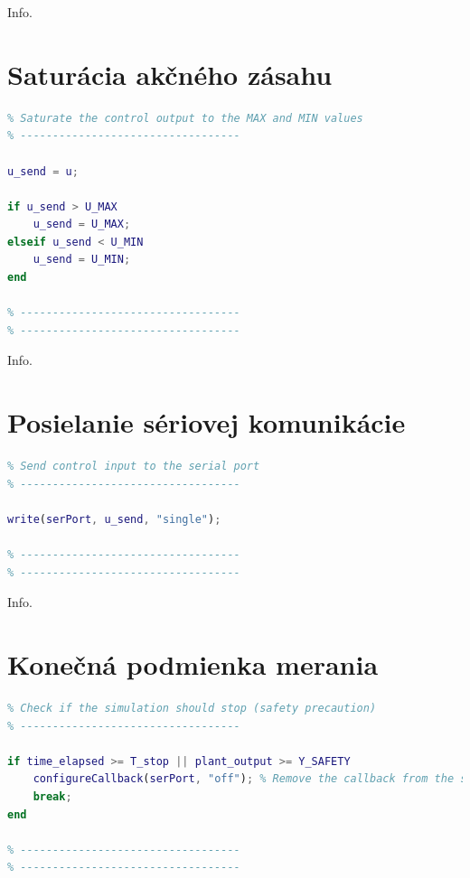 \documentclass[a4paper, 10pt, ]{article}
\begin{document}
Info.

\section{Saturácia akčného zásahu}
\begin{lstlisting}[caption=Obmedzenie akčného zásahu na maximálne a minimálne hodnoty., label={code:saturation}, language=Matlab]
% ----------------------------------
% Saturate the control output to the MAX and MIN values
% ----------------------------------

u_send = u;

if u_send > U_MAX
    u_send = U_MAX;
elseif u_send < U_MIN
    u_send = U_MIN;
end

% ----------------------------------
% ----------------------------------
\end{lstlisting}

Info.

\section{Posielanie sériovej komunikácie}
\begin{lstlisting}[caption=Funkcia na posielanie žiadanej akčnej veličiny po sériovej linke., label={code:send}, language=Matlab]
% ----------------------------------
% Send control input to the serial port
% ----------------------------------

write(serPort, u_send, "single");

% ----------------------------------
% ----------------------------------
\end{lstlisting}

Info.

\section{Konečná podmienka merania}
\begin{lstlisting}[caption=Podmienka na bezpečné ukončenie merania., label={code:safety}, language=Matlab]
% ----------------------------------
% Check if the simulation should stop (safety precaution)
% ----------------------------------

if time_elapsed >= T_stop || plant_output >= Y_SAFETY
    configureCallback(serPort, "off"); % Remove the callback from the serial port, before exiting the loop
    break;
end

% ----------------------------------
% ----------------------------------
\end{lstlisting}
\end{document}
